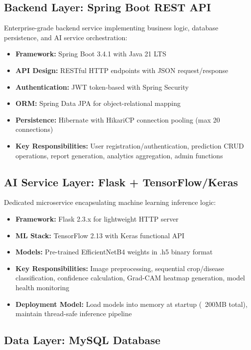 \documentclass[conference]{IEEEtran}
\begin{document}
\subsection{Backend Layer: Spring Boot REST API}

Enterprise-grade backend service implementing business logic, database persistence, and AI service orchestration:

\begin{itemize}
\item \textbf{Framework:} Spring Boot 3.4.1 with Java 21 LTS
\item \textbf{API Design:} RESTful HTTP endpoints with JSON request/response
\item \textbf{Authentication:} JWT token-based with Spring Security
\item \textbf{ORM:} Spring Data JPA for object-relational mapping
\item \textbf{Persistence:} Hibernate with HikariCP connection pooling (max 20 connections)
\item \textbf{Key Responsibilities:} User registration/authentication, prediction CRUD operations, report generation, analytics aggregation, admin functions
\end{itemize}

\subsection{AI Service Layer: Flask + TensorFlow/Keras}

Dedicated microservice encapsulating machine learning inference logic:

\begin{itemize}
\item \textbf{Framework:} Flask 2.3.x for lightweight HTTP server
\item \textbf{ML Stack:} TensorFlow 2.13 with Keras functional API
\item \textbf{Models:} Pre-trained EfficientNetB4 weights in .h5 binary format
\item \textbf{Key Responsibilities:} Image preprocessing, sequential crop/disease classification, confidence calculation, Grad-CAM heatmap generation, model health monitoring
\item \textbf{Deployment Model:} Load models into memory at startup (~200MB total), maintain thread-safe inference pipeline
\end{itemize}

\subsection{Data Layer: MySQL Database}
\end{document}
